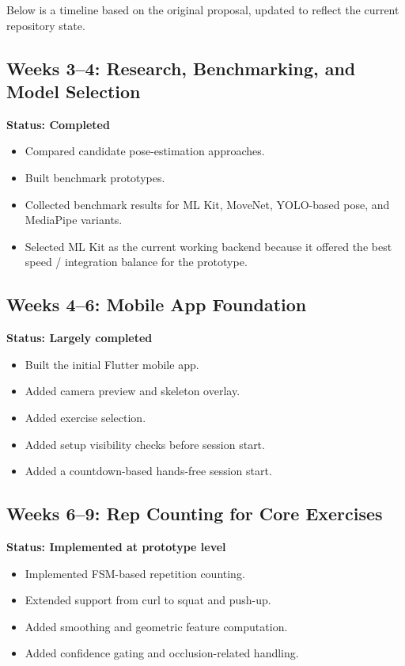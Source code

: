 \documentclass[12pt,a4paper]{article}
\begin{document}
Below is a timeline based on the original proposal, updated to reflect the current repository state.

\subsection{Weeks 3--4: Research, Benchmarking, and Model Selection}

\textbf{Status: Completed}

\begin{itemize}
    \item Compared candidate pose-estimation approaches.
    \item Built benchmark prototypes.
    \item Collected benchmark results for ML Kit, MoveNet, YOLO-based pose, and MediaPipe variants.
    \item Selected ML Kit as the current working backend because it offered the best speed / integration balance for the prototype.
\end{itemize}

\subsection{Weeks 4--6: Mobile App Foundation}

\textbf{Status: Largely completed}

\begin{itemize}
    \item Built the initial Flutter mobile app.
    \item Added camera preview and skeleton overlay.
    \item Added exercise selection.
    \item Added setup visibility checks before session start.
    \item Added a countdown-based hands-free session start.
\end{itemize}

\subsection{Weeks 6--9: Rep Counting for Core Exercises}

\textbf{Status: Implemented at prototype level}

\begin{itemize}
    \item Implemented FSM-based repetition counting.
    \item Extended support from curl to squat and push-up.
    \item Added smoothing and geometric feature computation.
    \item Added confidence gating and occlusion-related handling.
\end{itemize}
\end{document}
